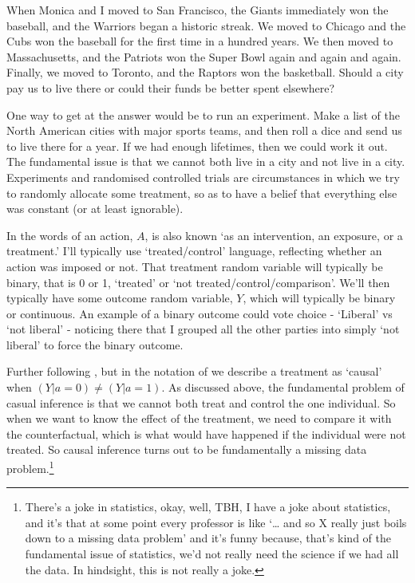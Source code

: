 \documentclass[
]{book}
\begin{document}
When Monica and I moved to San Francisco, the Giants immediately won the baseball, and the Warriors began a historic streak. We moved to Chicago and the Cubs won the baseball for the first time in a hundred years. We then moved to Massachusetts, and the Patriots won the Super Bowl again and again and again. Finally, we moved to Toronto, and the Raptors won the basketball. Should a city pay us to live there or could their funds be better spent elsewhere?

One way to get at the answer would be to run an experiment. Make a list of the North American cities with major sports teams, and then roll a dice and send us to live there for a year. If we had enough lifetimes, then we could work it out. The fundamental issue is that we cannot both live in a city and not live in a city. Experiments and randomised controlled trials are circumstances in which we try to randomly allocate some treatment, so as to have a belief that everything else was constant (or at least ignorable).

In the words of \citet[p.~3]{hernanrobins2020} an action, \(A\), is also known `as an intervention, an exposure, or a treatment.' I'll typically use `treated/control' language, reflecting whether an action was imposed or not. That treatment random variable will typically be binary, that is 0 or 1, `treated' or `not treated/control/comparison'. We'll then typically have some outcome random variable, \(Y\), which will typically be binary or continuous. An example of a binary outcome could vote choice - `Liberal' vs `not liberal' - noticing there that I grouped all the other parties into simply `not liberal' to force the binary outcome.

Further following \citet[p.~4]{hernanrobins2020}, but in the notation of \citet[p.~48]{gertler2016impact} we describe a treatment as `causal' when \((Y|a=0)\neq (Y|a=1)\). As discussed above, the fundamental problem of casual inference is that we cannot both treat and control the one individual. So when we want to know the effect of the treatment, we need to compare it with the counterfactual, which is what would have happened if the individual were not treated. So causal inference turns out to be fundamentally a missing data problem.\footnote{There's a joke in statistics, okay, well, TBH, I have a joke about statistics, and it's that at some point every professor is like `\ldots{} and so X really just boils down to a missing data problem' and it's funny because, that's kind of the fundamental issue of statistics, we'd not really need the science if we had all the data. In hindsight, this is not really a joke.}
\end{document}
